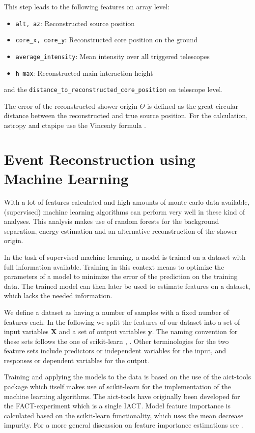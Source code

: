 This step leads to the following features on array level:
\begin{itemize}
    \item{\texttt{alt, az}: Reconstructed source position}
    \item{\texttt{core\_x, core\_y}: Reconstructed core position on the ground}
    \item{\texttt{average\_intensity}: Mean intensity over all triggered telescopes}
    \item{\texttt{h\_max}: Reconstructed main interaction height}
\end{itemize}
and the \texttt{distance\_to\_reconstructed\_core\_position}
on telescope level.

The error of the reconstructed shower origin $\Theta$ is defined
as the great circular distance between the reconstructed and true source position.
For the calculation, astropy and ctapipe use the Vincenty formula \cite{geodetic1975direct}.


\section{Event Reconstruction using Machine Learning}
With a lot of features calculated and high amounts of monte carlo
data available, (supervised) machine learning algorithms can perform
very well in these kind of analyses.
This analysis makes use of random forests for 
the background separation, energy estimation and an alternative reconstruction 
of the shower origin.

In the task of supervised machine learning, a model is trained on a
dataset with full information available.
Training in this context means to optimize the parameters of a 
model to minimize the error of the prediction on the training data.
The trained model can then later be used to estimate features on a dataset, which
lacks the needed information.

We define a dataset as having a number of samples with a fixed number of
features each. In the following we split
the features of our dataset into a set of input variables $\mathbf{X}$ and
a set of output variables $\mathbf{y}$.
The naming convention for
these sets follows the one of scikit-learn
\cite{scikit-learn}, \cite{sklearn_api}.
Other terminologies for the two feature sets include
predictors or independent variables for the input, and
responses or dependent variables for the output.

Training and applying the models to the data is based on the use of
the aict-tools package \cite{aict-tools} which itself makes use of
scikit-learn for the implementation of the machine learning algorithms.
The aict-tools have originally been developed for the FACT-experiment
which is a single IACT. 
Model feature importance is calculated
based on the scikit-learn functionality, which
uses the mean decrease impurity.
For a more general discussion on feature importance estimations see \cite{hastie2017springer}.

